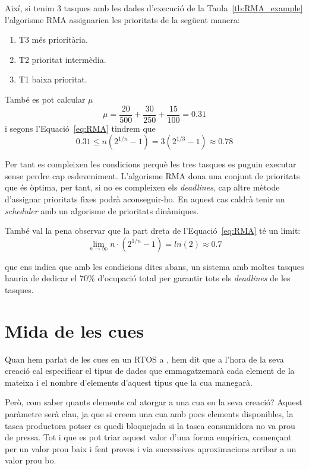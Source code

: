 Així, si tenim 3 tasques amb les dades d'execució de la Taula~\ref{tb:RMA_example} l'algorisme RMA assignarien les prioritats de la següent manera:

\begin{enumerate}
 \item T3 més prioritària.
 \item T2 prioritat intermèdia.
 \item T1 baixa prioritat.
\end{enumerate}

També es pot calcular $\mu$
\begin{equation*}
 \mu = \frac{20}{500} + \frac{30}{250} + \frac{15}{100} = 0.31
\end{equation*}
i segons l'Equació~\ref{eq:RMA} tindrem que
\begin{equation*}
 0.31 \leq n (2^{1/n}-1) = 3(2^{1/3}-1) \approx 0.78
\end{equation*}

Per tant es compleixen les condicions perquè les tres tasques es puguin executar sense perdre cap esdeveniment. L'algorisme RMA dona una conjunt de prioritats que és òptima, per tant, si no es compleixen els {\em deadlines}, cap altre mètode d'assignar prioritats fixes podrà aconseguir-ho. En aquest cas caldrà tenir un {\em scheduler} amb un algorisme de prioritats dinàmiques.

També val la pena observar que la part dreta de l'Equació~\ref{eq:RMA} té un límit:
\begin{equation*}
 \lim_{n\to\infty} n \cdot (2^{1/n}-1) = ln(2) \approx 0.7
\end{equation*}

que ens indica que amb les condicions dites abans, un sistema amb moltes tasques hauria de dedicar el 70\% d'ocupació total per garantir tots els {\em deadlines} de les tasques.

\section{Mida de les cues}
\label{sec:mida_cues}
Quan hem parlat de les cues en un \gls{RTOS} a , hem dit que a l'hora de la seva creació cal especificar el tipus de dades que emmagatzemarà cada element de la mateixa i el nombre d'elements d'aquest tipus que la cua manegarà.

Però, com saber quants elements cal atorgar a una cua en la seva creació? Aquest paràmetre serà clau, ja que si creem una cua amb pocs elements disponibles, la tasca productora potser es quedi bloquejada si la tasca consumidora no va prou de pressa. Tot i que es pot triar aquest valor d'una forma empírica, començant per un valor prou baix i fent proves i via successives aproximacions arribar a un valor prou bo.


